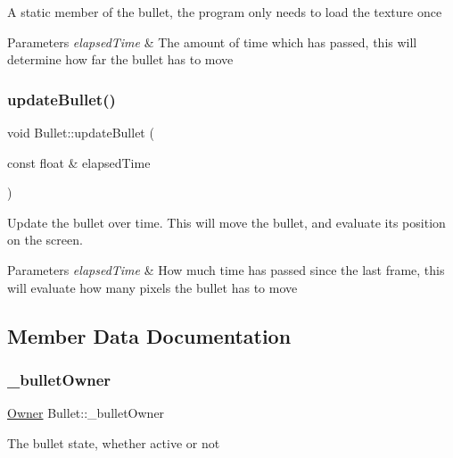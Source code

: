 A static member of the bullet, the program only needs to load the texture once 
\begin{DoxyParams}{Parameters}
{\em elapsed\+Time} & The amount of time which has passed, this will determine how far the bullet has to move \\
\hline
\end{DoxyParams}
\mbox{\label{class_bullet_a241c1ceb808ae0f93e4f66f28bbd525f}} 
\subsubsection{\texorpdfstring{update\+Bullet()}{updateBullet()}}
{\footnotesize\ttfamily void Bullet\+::update\+Bullet (\begin{DoxyParamCaption}\item[{const float \&}]{elapsed\+Time }\end{DoxyParamCaption})}



Update the bullet over time. This will move the bullet, and evaluate its position on the screen. 


\begin{DoxyParams}{Parameters}
{\em elapsed\+Time} & How much time has passed since the last frame, this will evaluate how many pixels the bullet has to move \\
\hline
\end{DoxyParams}


\subsection{Member Data Documentation}
\mbox{\label{class_bullet_af9fd5bbfc7e4e6a5a0f7e5af45360309}} 
\subsubsection{\texorpdfstring{\+\_\+bullet\+Owner}{\_bulletOwner}}
{\footnotesize\ttfamily \hyperlink{_bullet_8h_a3b5e9e55eb7b08d5702a101e529e5507}{Owner} Bullet\+::\+\_\+bullet\+Owner\hspace{0.3cm}{\ttfamily [private]}}

The bullet state, whether active or not \mbox{\label{class_bullet_a02a711293bc8bb2e8c7107811071c2e3}} 
